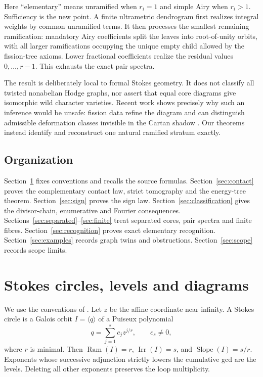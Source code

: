 \documentclass[11pt,a4paper]{amsart}
\theoremstyle{plain}
\theoremstyle{definition}
\newcommand{\Ram}{\operatorname{Ram}}
\newcommand{\Irr}{\operatorname{Irr}}
\newcommand{\Slope}{\operatorname{Slope}}
\begin{document}
Here ``elementary'' means unramified when $r_i=1$ and simple Airy when $r_i>1$.  Sufficiency is the
new point.  A finite ultrametric dendrogram first realizes integral weights by common unramified
terms.  It then processes the smallest remaining ramification: mandatory Airy coefficients split
the leaves into root-of-unity orbits, with all larger ramifications occupying the unique empty
child allowed by the fission-tree axioms.  Lower fractional coefficients realize the residual
values $0,\ldots,r-1$.  This exhausts the exact pair spectra.

The result is deliberately local to formal Stokes geometry.  It does not classify all twisted
nonabelian Hodge graphs, nor assert that equal core diagrams give isomorphic wild character
varieties.  Recent work shows precisely why such an inference would be unsafe: fission data refine
the diagram and can distinguish admissible deformation classes invisible in the Cartan shadow
\cite{Doucot2026Basic}.  Our theorems instead identify and reconstruct one natural ramified stratum
exactly.

\subsection*{Organization}
Section~\ref{sec:background} fixes conventions and recalls the source formulas.
Section~\ref{sec:contact} proves the complementary contact law, strict tomography and the energy-tree
theorem.  Section~\ref{sec:sign} proves the sign law.  Section~\ref{sec:classification} gives the
divisor-chain, enumerative and Fourier consequences.  Sections~\ref{sec:separated}--\ref{sec:finite}
treat separated cores, pair spectra and finite fibres.  Section~\ref{sec:recognition} proves exact
elementary recognition.  Section~\ref{sec:examples} records graph twins and obstructions.
Section~\ref{sec:scope} records scope limits.

\section{Stokes circles, levels and diagrams}\label{sec:background}

We use the conventions of \cite[\S2]{Doucot2025Graphs}.  Let $z$ be the affine coordinate near
infinity.  A Stokes circle is a Galois orbit $I=\langle q\rangle$ of a Puiseux polynomial
\[
  q=\sum_{j=1}^{s}c_jz^{j/r},\qquad c_s\ne0,
\]
where $r$ is minimal.  Then $\Ram(I)=r$, $\Irr(I)=s$, and $\Slope(I)=s/r$.  Exponents whose
successive adjunction strictly lowers the cumulative gcd are the levels.  Deleting all other
exponents preserves the loop multiplicity.
\end{document}
